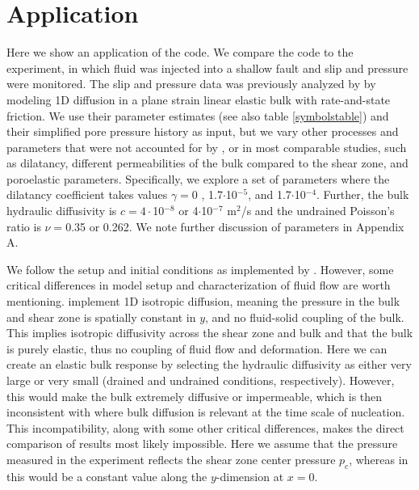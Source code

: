 \documentclass[draft]{agujournal2019}
\begin{document}
\section{Application} \label{sec:app}

Here we show an application of the code. We compare the code to the  experiment, in which fluid was injected into a shallow fault and slip and pressure were monitored. The slip and pressure data was previously analyzed by  by modeling 1D diffusion in a plane strain linear elastic bulk with rate-and-state friction. We use their parameter estimates (see also table \ref{symbolstable}) and their simplified pore pressure history \cite<see Figure 2 in>{Larochelle2021} as input, but we vary other processes and parameters that were not accounted for by , or in most comparable studies, such as dilatancy, different permeabilities of the bulk compared to the shear zone, and poroelastic parameters. Specifically, we explore a set of parameters where the dilatancy coefficient takes values $\gamma = $0 , 1.7$\cdot$10$^{-5}$, and 1.7$\cdot$10$^{-4}$. Further, the bulk hydraulic diffusivity is $c = 4\cdot$10$^{-8}$ or 4$\cdot$10$^{-7}$ m$^2$/s and the undrained Poisson's ratio is $\nu = $0.35 or 0.262. We note further discussion of parameters in Appendix A.

We follow the setup and initial conditions as implemented by . However, some critical differences in model setup and characterization of fluid flow are worth mentioning.   implement 1D isotropic diffusion, meaning the pressure in the bulk and shear zone is spatially constant in $y$, and no fluid-solid coupling of the bulk. This implies isotropic diffusivity across the shear zone and bulk and that the bulk is purely elastic, thus no coupling of fluid flow and deformation. Here we can create an elastic bulk response by selecting the hydraulic diffusivity as either very large or very small (drained and undrained conditions, respectively). However, this would make the bulk extremely diffusive or impermeable, which is then inconsistent with  where bulk diffusion is relevant at the time scale of nucleation. This incompatibility, along with some other critical differences, makes the direct comparison of results most likely impossible. Here we assume that the pressure measured in the experiment  reflects the shear zone center pressure $p_c$, whereas in  this would be a constant value along the $y$-dimension at $x = 0$. 
\end{document}

